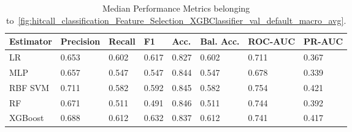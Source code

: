 \begin{longtable}{llllllll}
\caption{Median Performance Metrics belonging to~\ref{fig:hitcall_classification_Feature_Selection_XGBClassifier_val_default_macro_avg}.}\label{tab:table:hitcall_classification_feature_selection_xgbclassifier_val_default_macro_avg}\\
\toprule
\midrule
\small Estimator & \small Precision & \small Recall & \small F1 & \small Acc. & \small Bal. Acc. & \small ROC-AUC & \small PR-AUC\\
\hline
LR & 0.653 & 0.602 & 0.617 & 0.827 & 0.602 & 0.711 & 0.367\\
MLP & 0.657 & 0.547 & 0.547 & 0.844 & 0.547 & 0.678 & 0.339\\
RBF SVM & 0.711 & 0.582 & 0.592 & 0.845 & 0.582 & 0.754 & 0.421\\
RF & 0.671 & 0.511 & 0.491 & 0.846 & 0.511 & 0.744 & 0.392\\
XGBoost & 0.688 & 0.612 & 0.632 & 0.837 & 0.612 & 0.741 & 0.417\\
\bottomrule
\end{longtable}